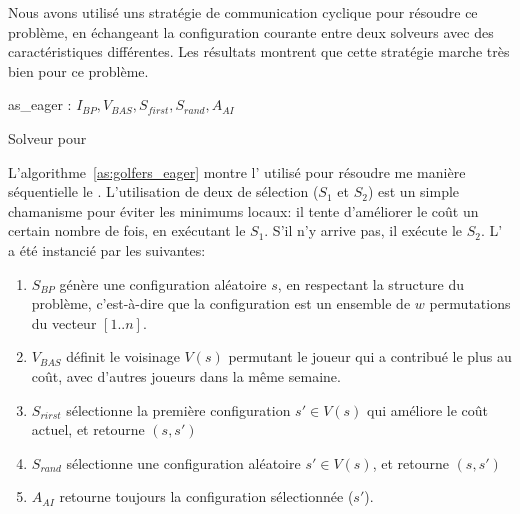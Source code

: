 \documentclass{jfpc-preprint}
\begin{document}
Nous avons utilisé uns stratégie de communication cyclique pour résoudre ce problème, en échangeant la configuration courante entre deux solveurs avec des caractéristiques différentes. Les résultats montrent que cette stratégie marche très bien pour ce problème.

\begin{algorithm}
\dontprintsemicolon
\scriptsize
\SetNoline
{}
   as\_eager\;
\algoindent {} : $I_{BP}, V_{BAS}, S_{first}, S_{rand}, A_{AI}$ \;
\caption{Solveur pour \SGP}\label{as:golfers_eager}
\end{algorithm}

L'algorithme~\ref{as:golfers_eager} montre l'\as{} utilisé pour résoudre me manière séquentielle le \SGP{}. L'utilisation de deux \ms{} de sélection ($S_1$ et $S_2$) est un simple chamanisme pour éviter les minimums locaux: il tente d'améliorer le coût un certain nombre de fois, en exécutant le \om{} $S_1$. S'il n'y arrive pas, il exécute le \om{} $S_2$. L'\as{} a été instancié par les \oms{} suivantes:

\begin{enumerate}
\item $S_{BP}$ génère une configuration aléatoire $s$, en respectant la structure du problème, c'est-à-dire que la configuration est un ensemble de $w$ permutations du vecteur $[1..n]$.
\item $V_{BAS}$ définit le voisinage $V \left(s\right)$ permutant le joueur qui a contribué le plus au coût, avec d'autres joueurs dans la même semaine.
\item $S_{rirst}$ sélectionne la première configuration $s'\in V\left (s\right)$ qui améliore le coût actuel, et retourne $(s, s')$
\item $S_{rand}$ sélectionne une configuration aléatoire $s'\in V\left(s\right)$, et retourne $(s, s')$
\item $A_{AI}$ retourne toujours la configuration sélectionnée ($s'$).
\end{enumerate}
\end{document}
